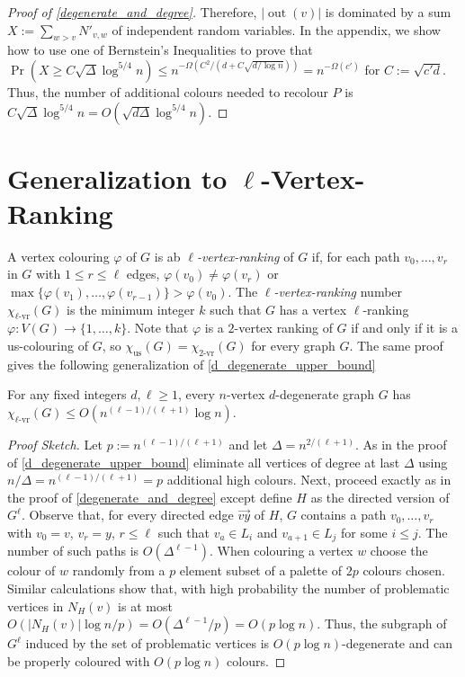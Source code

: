 \documentclass{patmorin}
\newcommand{\defin}[1]{\emph{\color{brightmaroon}#1}}
\DeclareMathOperator{\outn}{out}
\newcommand{\rn}[1]{\chi_{\operatorname{#1-vr}}}
\newcommand{\trn}{\chi_{\mathrm{us}}}
\newcommand{\lrn}{\rn{\ell}}
\begin{document}
\begin{proof}[Proof of \cref{degenerate_and_degree}]
  Therefore, $|\outn(v)|$ is dominated by a sum $X:=\sum_{w> v} N'_{v,w}$ of independent random variables.  In the appendix, we show how to use one of Bernstein's Inequalities to prove that $\Pr\left(X\ge C\sqrt{\Delta}\log^{5/4} n\right)\le n^{-\Omega(C^2/(d+C\sqrt{d/\log n}))} = n^{-\Omega(c')}$ for $C:=\sqrt{c'd}$.  Thus, the number of additional colours needed to recolour $P$ is $C\sqrt{\Delta}\log^{5/4} n = O(\sqrt{d\Delta}\log^{5/4} n)$.
\end{proof}

\section{Generalization to $\ell$-Vertex-Ranking}

A vertex colouring $\varphi$ of $G$ is ab \defin{$\ell$-vertex-ranking} of $G$ if, for each path $v_0,\ldots,v_r$ in $G$ with $1\le r\le\ell$ edges, $\varphi(v_0)\neq \varphi(v_r)$ or $\max\{\varphi(v_1),\ldots,\varphi(v_{r-1})\}>\varphi(v_0)$.  The \defin{$\ell$-vertex-ranking} number $\lrn(G)$ is the minimum integer $k$ such that $G$ has a vertex $\ell$-ranking $\varphi:V(G)\to\{1,\ldots,k\}$.  Note that $\varphi$ is a $2$-vertex ranking of $G$ if and only if it is a us-colouring of $G$, so $\trn(G)=\rn{2}(G)$ for every graph $G$.  The same proof gives the following generalization of \cref{d_degenerate_upper_bound}

\begin{thm}
  For any fixed integers $d,\ell\ge 1$, every $n$-vertex $d$-degenerate graph $G$ has $\lrn(G) \le O(n^{(\ell-1)/(\ell+1)}\log  n)$.
\end{thm}

\begin{proof}[Proof Sketch]
  Let $p:=n^{(\ell-1)/(\ell+1)}$ and let $\Delta=n^{2/(\ell+1)}$.  As in the proof of \cref{d_degenerate_upper_bound} eliminate all vertices of degree at last $\Delta$ using $n/\Delta = n^{(\ell-1)/(\ell+1)}=p$ additional high colours.  Next, proceed exactly as in the proof of \cref{degenerate_and_degree} except define $H$ as the directed version of $G^{\ell}$.  Observe that, for every directed edge $\overrightarrow{vy}$ of $H$, $G$ contains a path $v_0,\ldots,v_r$ with $v_0=v$, $v_r=y$, $r\le \ell$ such that $v_a\in L_i$ and $v_{a+1}\in L_j$ for some $i\le j$.  The number of such paths is $O(\Delta^{\ell-1})$. When colouring a vertex $w$ choose the colour of $w$ randomly from a $p$ element subset of a palette of $2p$ colours chosen.  Similar calculations show that, with high probability the number of problematic vertices in $N_H(v)$ is at most $O(|N_H(v)|\log n/p)=O(\Delta^{\ell-1}/p)=O(p\log n)$.  Thus, the subgraph of $G^\ell$ induced by the set of problematic vertices is $O(p\log n)$-degenerate and can be properly coloured with $O(p\log n)$ colours.
\end{proof}
\end{document}
